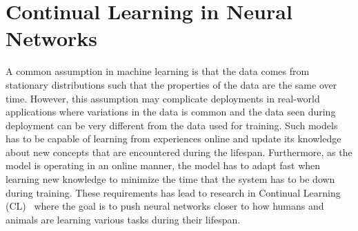 \section{Continual Learning in Neural Networks}
\label{sec:continual_learning}

A common assumption in machine learning is that the data comes from stationary distributions such that the properties of the data are the same over time. However, this assumption may complicate deployments in real-world applications where variations in the data is common and the data seen during deployment can be very different from the data used for training. Such models has to be capable of learning from experiences online and update its knowledge about new concepts that are encountered during the lifespan. Furthermore, as the model is operating in an online manner, the model has to adapt fast when learning new knowledge to minimize the time that the system has to be down during training. These requirements has lead to research in Continual Learning (CL)~\cite{delange2021continual, parisi2019continual} where the goal is to push neural networks closer to how humans and animals are learning various tasks during their lifespan.

    

  